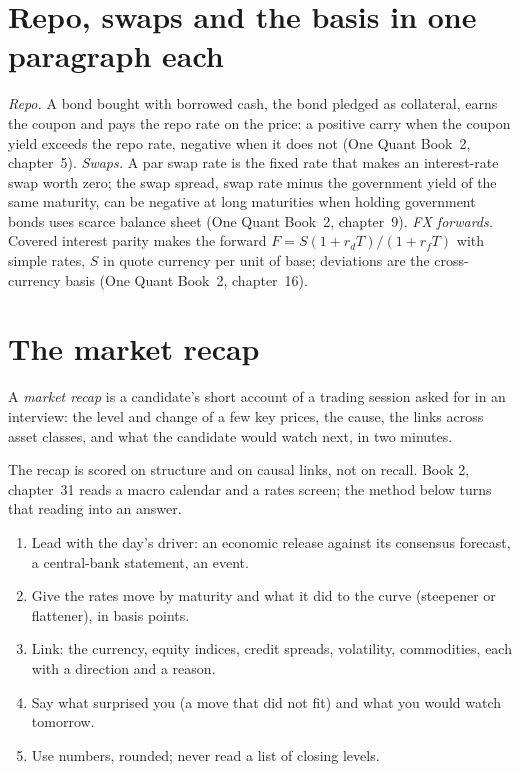 \section{Repo, swaps and the basis in one paragraph each}

\emph{Repo.} A bond bought with borrowed cash, the bond pledged as collateral, earns the coupon and pays the repo rate on
the price: a positive carry when the coupon yield exceeds the repo rate, negative when it does not (One Quant Book~2,
chapter~5). \emph{Swaps.} A par swap rate is the fixed rate that makes an interest-rate swap worth zero; the swap spread,
swap rate minus the government yield of the same maturity, can be negative at long maturities when holding government bonds
uses scarce balance sheet (One Quant Book~2, chapter~9). \emph{FX forwards.} Covered interest parity makes the forward
$F = S(1 + r_d T)/(1 + r_f T)$ with simple rates, $S$ in quote currency per unit of base; deviations are the cross-currency
basis (One Quant Book~2, chapter~16).

\section{The market recap}

\begin{definition}\label{def:iv:fixed-income-and-markets:recap}
A \emph{market recap} is a candidate's short account of a trading session asked for in an interview:
the level and change of a few key prices, the cause, the links across asset classes, and what the candidate would watch
next, in two minutes.
\end{definition}

The recap is scored on structure and on causal links, not on recall. Book 2, chapter~31 reads a macro calendar and a rates
screen; the method below turns that reading into an answer.

\begin{method}\label{met:iv:fixed-income-and-markets:recap}
\begin{enumerate}
\item Lead with the day's driver: an economic release against its consensus forecast, a central-bank statement, an
event.
\item Give the rates move by maturity and what it did to the curve (steepener or flattener), in basis points.
\item Link: the currency, equity indices, credit spreads, volatility, commodities, each with a direction and a reason.
\item Say what surprised you (a move that did not fit) and what you would watch tomorrow.
\item Use numbers, rounded; never read a list of closing levels.
\end{enumerate}
\end{method}


